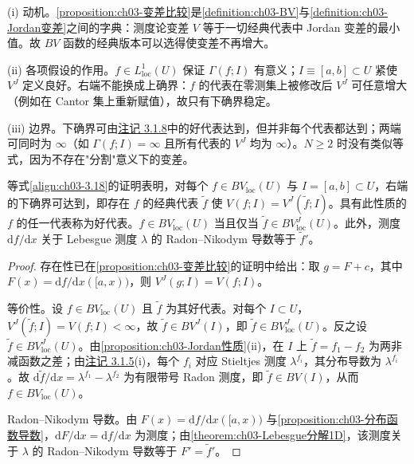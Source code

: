 \documentclass[../../main.tex]{subfiles}%
\begin{document}
\begin{remark}\label{remark:ch03-变差比较动机}
(i) 动机。\cref{proposition:ch03-变差比较}是\cref{definition:ch03-BV}与\cref{definition:ch03-Jordan变差}之间的字典：测度论变差 $V$ 等于一切经典代表中 Jordan 变差的最小值。故 $BV$ 函数的经典版本可以选得使变差不再增大。

(ii) 各项假设的作用。$f\in L^1_{\mathrm{loc}}(U)$ 保证 $\Gamma(f;I)$ 有意义；$I\equiv[a,b]\subset U$ 紧使 $V^J$ 定义良好。右端不能换成上确界：$f$ 的代表在零测集上被修改后 $V^J$ 可任意增大（例如在 Cantor 集上重新赋值），故只有下确界稳定。

(iii) 边界。下确界可由\hyperref[remark:ch03-好代表]{注记 3.1.8}中的好代表达到，但并非每个代表都达到；两端可同时为 $\infty$（如 $\Gamma(f;I)=\infty$ 且所有代表的 $V^J$ 均为 $\infty$）。$N\geqslant2$ 时没有类似等式，因为不存在"分割"意义下的变差。
\end{remark}

\begin{remark}\label{remark:ch03-好代表}
等式\eqref{align:ch03-3.18}的证明表明，对每个 $f\in BV_{\mathrm{loc}}(U)$ 与 $I=[a,b]\subset U$，右端的下确界可达到，即存在 $f$ 的经典代表 $\widetilde f$ 使 $V(f;I)=V^J(\widetilde f;I)$。具有此性质的 $f$ 的任一代表称为好代表。$f\in BV_{\mathrm{loc}}(U)$ 当且仅当 $\widetilde f\in BV^J_{\mathrm{loc}}(U)$。此外，测度 $\mathrm{d}f/\mathrm{d}x$ 关于 Lebesgue 测度 $\lambda$ 的 Radon--Nikodym 导数等于 $\widetilde f'$。
\end{remark}

\begin{proof}
存在性已在\cref{proposition:ch03-变差比较}的证明中给出：取 $g=F+c$，其中 $F(x)=\mathrm{d}f/\mathrm{d}x([a,x))$，则 $V^J(g;I)=V(f;I)$。

等价性。设 $f\in BV_{\mathrm{loc}}(U)$ 且 $\widetilde f$ 为其好代表。对每个 $I\subset U$，$V^J(\widetilde f;I)=V(f;I)<\infty$，故 $\widetilde f\in BV^J(I)$，即 $\widetilde f\in BV^J_{\mathrm{loc}}(U)$。反之设 $\widetilde f\in BV^J_{\mathrm{loc}}(U)$。由\cref{proposition:ch03-Jordan性质}(ii)，在 $I$ 上 $\widetilde f=f_1-f_2$ 为两非减函数之差；由\hyperref[remark:ch03-Stieltjes]{注记 3.1.5}(i)，每个 $f_i$ 对应 Stieltjes 测度 $\lambda^{f_i}$，其分布导数为 $\lambda^{f_i}$。故 $\mathrm{d}\widetilde f/\mathrm{d}x=\lambda^{f_1}-\lambda^{f_2}$ 为有限带号 Radon 测度，即 $\widetilde f\in BV(I)$，从而 $f\in BV_{\mathrm{loc}}(U)$。

Radon--Nikodym 导数。由 $F(x)=\mathrm{d}f/\mathrm{d}x([a,x))$ 与\cref{proposition:ch03-分布函数导数}，$\mathrm{d}F/\mathrm{d}x=\mathrm{d}f/\mathrm{d}x$ 为测度；由\cref{theorem:ch03-Lebesgue分解1D}，该测度关于 $\lambda$ 的 Radon--Nikodym 导数等于 $F'=\widetilde f'$。
\end{proof}
\end{document}
